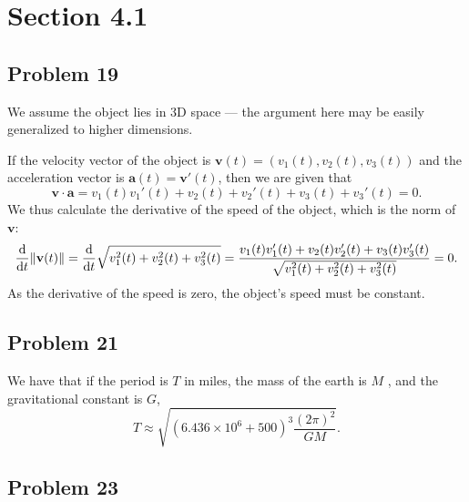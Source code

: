 \documentclass[11pt]{article}
\renewcommand{\vec}[1]{\mathbf{#1}}
\begin{document}

\section{Section 4.1}


\subsection*{Problem 19}

We assume the object lies in 3D space --- the argument here may be easily generalized to higher dimensions.

If the velocity vector of the object is $\vec{v}(t) = (v_{1}(t), v_{2}(t), v_{3}(t))$ and the acceleration vector is $\vec{a}(t) = \vec{v}'(t)$, then we are given that
\[
	\vec{v} \cdot \vec{a} = v_{1}(t) v_{1}'(t) + v_{2}(t) + v_{2}'(t) + v_{3}(t) + v_{3}'(t) = 0.
\]
We thus calculate the derivative of the speed of the object, which is the norm of $\vec{v}$:
\[
	\dv{t} \norm{\vec{v}(t)} = \dv{t} \sqrt{v_{1}^{2}(t) + v_{2}^{2}(t) + v_{3}^{2}(t)} = \frac{v_{1}(t) v_{1}'(t) + v_{2}(t) v_{2}'(t) + v_{3}(t) v_{3}'(t)}{\sqrt{v_{1}^{2}(t) + v_{2}^{2}(t) + v_{3}^{2}(t)}} = 0.
\]
As the derivative of the speed is zero, the object's speed must be constant.

\subsection*{Problem 21}

We have that if the period is $T$ in miles, the mass of the earth is $M$ , and the gravitational constant is $G$,
\[
	T \approx \sqrt{(6.436 \times 10^{6} + 500)^{3} \frac{(2\pi)^{2}}{GM}}.
\]


\subsection*{Problem 23}
\end{document}
